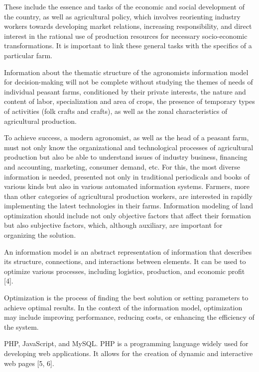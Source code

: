 \begin{multicols}{2}
These include the essence and tasks of the economic and social
development of the country, as well as agricultural policy, which
involves reorienting industry workers towards developing market
relations, increasing responsibility, and direct interest in the
rational use of production resources for necessary socio-economic
transformations. It is important to link these general tasks with the
specifics of a particular farm.

Information about the thematic structure of the
agronomists\textquotesingle{} information model for decision-making will
not be complete without studying the themes of needs of individual
peasant farms, conditioned by their private interests, the nature and
content of labor, specialization and area of crops, the presence of
temporary types of activities (folk crafts and crafts), as well as the
zonal characteristics of agricultural production.

To achieve success, a modern agronomist, as well as the head of a
peasant farm, must not only know the organizational and technological
processes of agricultural production but also be able to understand
issues of industry business, financing and accounting, marketing,
consumer demand, etc. For this, the most diverse information is needed,
presented not only in traditional periodicals and books of various kinds
but also in various automated information systems. Farmers, more than
other categories of agricultural production workers, are interested in
rapidly implementing the latest technologies in their farms. Information
modeling of land optimization should include not only objective factors
that affect their formation but also subjective factors, which, although
auxiliary, are important for organizing the solution.

An information model is an abstract representation of information that
describes its structure, connections, and interactions between elements.
It can be used to optimize various processes, including logistics,
production, and economic profit {[}4{]}.

Optimization is the process of finding the best solution or setting
parameters to achieve optimal results. In the context of the information
model, optimization may include improving performance, reducing costs,
or enhancing the efficiency of the system.

PHP, JavaScript, and MySQL. PHP is a programming language widely used
for developing web applications. It allows for the creation of dynamic
and interactive web pages {[}5, 6{]}.


\end{multicols}
